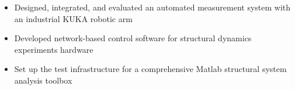 {{    {
      \begin{itemize}[left=0mm]
        \item Designed, integrated, and evaluated an automated measurement system with an industrial KUKA robotic arm
        \item Developed network-based control software for structural dynamics experiments hardware
        \item Set up the test infrastructure for a comprehensive Matlab structural system analysis toolbox
      \end{itemize}
      \vspace{1mm}
    }
}
}


